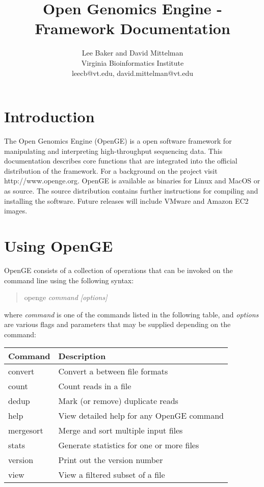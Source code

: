 \documentclass[11pt]{article}
\newcommand {\cmd}[1] {\begin{quote}#1\end{quote}}
\begin{document}
\title{Open Genomics Engine - Framework Documentation}
\author{Lee Baker and David Mittelman\\
Virginia Bioinformatics Institute \\
leecb@vt.edu, david.mittelman@vt.edu}
\maketitle

\section {Introduction}
The Open Genomics Engine (OpenGE) is a open software framework for manipulating and interpreting high-throughput sequencing data. This documentation describes core functions that are integrated into the official distribution of the framework. For a background on the project visit http://www.openge.org. OpenGE is available as binaries for Linux and MacOS or as source. The source distribution contains further instructions for compiling and installing the software. Future releases will include VMware and Amazon EC2 images.
\section {Using OpenGE}
OpenGE consists of a collection of operations that can be invoked on the command line using the following syntax:

\cmd{openge \textit{command [options]}}

where \textit{command} is one of the commands listed in the following table, and \textit{options} are various flags and parameters that may be supplied depending on the command:

\begin{center}
\begin{tabular}{lp{3.5in}}
\hline
Command&Description\\ \hline
convert&Convert a between file formats\\
count&Count reads in a file\\
dedup&Mark (or remove) duplicate reads\\
help&View detailed help for any OpenGE command\\
mergesort&Merge and sort multiple input files\\
stats&Generate statistics for one or more files\\
version&Print out the version number\\
view&View a filtered subset of a file\\
\end{tabular}
\end{center}
\end{document}
